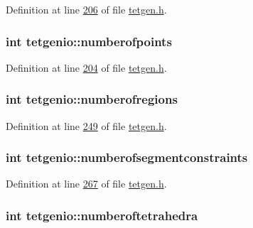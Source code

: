 Definition at line \hyperlink{tetgen_8h_source_l00206}{206} of file \hyperlink{tetgen_8h_source}{tetgen.\+h}.

\subsubsection[{\texorpdfstring{numberofpoints}{numberofpoints}}]{\setlength{\rightskip}{0pt plus 5cm}int tetgenio\+::numberofpoints}\hypertarget{classtetgenio_a5211bec795ba870c01fadade4cd8670f}{}\label{classtetgenio_a5211bec795ba870c01fadade4cd8670f}


Definition at line \hyperlink{tetgen_8h_source_l00204}{204} of file \hyperlink{tetgen_8h_source}{tetgen.\+h}.

\subsubsection[{\texorpdfstring{numberofregions}{numberofregions}}]{\setlength{\rightskip}{0pt plus 5cm}int tetgenio\+::numberofregions}\hypertarget{classtetgenio_a0394c99b57c4412515183ada3c1d8951}{}\label{classtetgenio_a0394c99b57c4412515183ada3c1d8951}


Definition at line \hyperlink{tetgen_8h_source_l00249}{249} of file \hyperlink{tetgen_8h_source}{tetgen.\+h}.

\subsubsection[{\texorpdfstring{numberofsegmentconstraints}{numberofsegmentconstraints}}]{\setlength{\rightskip}{0pt plus 5cm}int tetgenio\+::numberofsegmentconstraints}\hypertarget{classtetgenio_a56142dec4914ffaaf5093c4aaa23b7d4}{}\label{classtetgenio_a56142dec4914ffaaf5093c4aaa23b7d4}


Definition at line \hyperlink{tetgen_8h_source_l00267}{267} of file \hyperlink{tetgen_8h_source}{tetgen.\+h}.

\subsubsection[{\texorpdfstring{numberoftetrahedra}{numberoftetrahedra}}]{\setlength{\rightskip}{0pt plus 5cm}int tetgenio\+::numberoftetrahedra}\hypertarget{classtetgenio_ad9a3fc307214cd459ca367c55d4bc16d}{}\label{classtetgenio_ad9a3fc307214cd459ca367c55d4bc16d}


